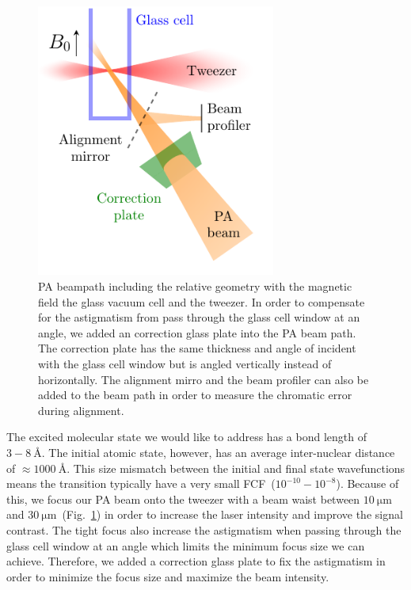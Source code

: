 \begin{figure}
  \centering
  \includegraphics[width=0.7\textwidth]{figures/pa_beampath.pdf}
  \caption[PA beampath]{
    PA beampath including the relative geometry with the magnetic field
    the glass vacuum cell and the tweezer.
    In order to compensate for the astigmatism from pass through the glass cell window
    at an angle, we added an correction glass plate into the PA beam path.
    The correction plate has the same thickness and angle of incident with the glass cell window
    but is angled vertically instead of horizontally.
    The alignment mirro and the beam profiler can also be added to the beam path
    in order to measure the chromatic error during alignment.
    \label{fig:pa:beampath}}
\end{figure}

The excited molecular state we would like to address has a bond length of $3-8~\text{\AA}$.
The initial atomic state, however, has an average inter-nuclear distance of
$\approx\!1000~\text{\AA}$.
This size mismatch between the initial and final state wavefunctions
means the transition typically have a very small FCF~($10^{-10}-10^{-8}$).
Because of this, we focus our PA beam onto the tweezer with a beam waist between
$10~\mathrm{\mu m}$ and $30~\mathrm{\mu m}$~(Fig.~\ref{fig:pa:beampath}) in order to
increase the laser intensity and improve the signal contrast.
The tight focus also increase the astigmatism when passing through
the glass cell window at an angle which limits the minimum focus size we can achieve.
Therefore, we added a correction glass plate to fix the astigmatism
in order to minimize the focus size and maximize the beam intensity.


